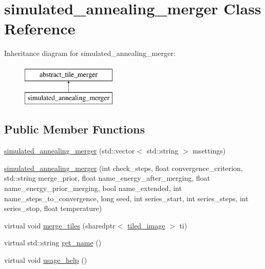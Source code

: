 \hypertarget{classsimulated__annealing__merger}{\section{simulated\-\_\-annealing\-\_\-merger Class Reference}
\label{classsimulated__annealing__merger}
}
Inheritance diagram for simulated\-\_\-annealing\-\_\-merger\-:\begin{figure}[H]
\begin{center}
\leavevmode
\includegraphics[height=2.000000cm]{classsimulated__annealing__merger}
\end{center}
\end{figure}
\subsection*{Public Member Functions}
\begin{DoxyCompactItemize}
\item 
\hyperlink{classsimulated__annealing__merger_a33e2b3d30d61a34eb697e3015142ce73}{simulated\-\_\-annealing\-\_\-merger} (std\-::vector$<$ std\-::string $>$ msettings)
\item 
\hyperlink{classsimulated__annealing__merger_aea3607464ea329c96df54078c8ce5240}{simulated\-\_\-annealing\-\_\-merger} (int check\-\_\-steps, float convergence\-\_\-criterion, std\-::string merge\-\_\-prior, float name\-\_\-energy\-\_\-after\-\_\-merging, float name\-\_\-energy\-\_\-prior\-\_\-merging, bool name\-\_\-extended, int name\-\_\-steps\-\_\-to\-\_\-convergence, long seed, int series\-\_\-start, int series\-\_\-steps, int series\-\_\-stop, float temperature)
\item 
virtual void \hyperlink{classsimulated__annealing__merger_a21e9db315c2a977b06a2e0f1594eea8c}{merge\-\_\-tiles} (sharedptr$<$ \hyperlink{classtiled__image}{tiled\-\_\-image} $>$ ti)
\item 
virtual std\-::string \hyperlink{classsimulated__annealing__merger_a2548233017acafb226be7bcdb2c91e22}{get\-\_\-name} ()
\item 
virtual void \hyperlink{classsimulated__annealing__merger_a34ac2a006a40fe0b4e57c6868803bf07}{usage\-\_\-help} ()
\end{DoxyCompactItemize}


